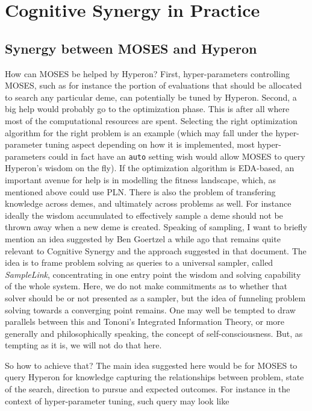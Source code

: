 \documentclass[]{report}
\begin{document}
\chapter{Cognitive Synergy in Practice}

\section{Synergy between MOSES and Hyperon}

How can MOSES be helped by Hyperon?  First, hyper-parameters
controlling MOSES, such as for instance the portion of evaluations
that should be allocated to search any particular deme, can
potentially be tuned by Hyperon.  Second, a big help would probably go
to the optimization phase.  This is after all where most of the
computational resources are spent.  Selecting the right optimization
algorithm for the right problem is an example (which may fall under
the hyper-parameter tuning aspect depending on how it is implemented,
most hyper-parameters could in fact have an \texttt{auto} setting wish
would allow MOSES to query Hyperon's wisdom on the fly).  If the
optimization algorithm is EDA-based, an important avenue for help is
in modelling the fitness landscape, which, as mentioned above could
use PLN.  There is also the problem of transfering knowledge across
demes, and ultimately across problems as well.  For instance ideally
the wisdom accumulated to effectively sample a deme should not be
thrown away when a new deme is created.  Speaking of sampling, I want
to briefly mention an idea suggested by Ben Goertzel a while ago that
remains quite relevant to Cognitive Synergy and the approach suggested
in that document.  The idea is to frame problem solving as queries to
a universal sampler, called \emph{SampleLink}, concentrating in one
entry point the wisdom and solving capability of the whole system.
Here, we do not make commitments as to whether that solver should be
or not presented as a sampler, but the idea of funneling problem
solving towards a converging point remains.  One may well be tempted
to draw parallels between this and Tononi's Integrated Information
Theory, or more generally and philosophically speaking, the concept of
self-consciousness.  But, as tempting as it is, we will not do that
here.

So how to achieve that?  The main idea suggested here would be for
MOSES to query Hyperon for knowledge capturing the relationships
between problem, state of the search, direction to pursue and expected
outcomes.  For instance in the context of hyper-parameter tuning, such
query may look like\\
\end{document}
